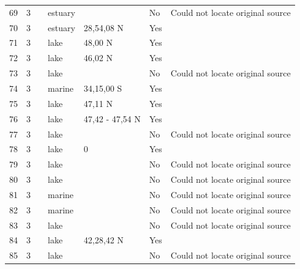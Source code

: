 \documentclass[12pt]{article}
\begin{document}
\begin{landscape}
\begin{table}[h!]
{\begin{tabular}{p{2.8cm}p{1.3cm}p{3cm}p{2.2cm}p{2.5cm}lp{8.2cm}}
        69    & 3 & \cite{Cohen1990}  & estuary &       & No    & Could not locate original source \\
        70    & 3 & \cite{Kemp1977}    & estuary & 28,54,08 N & Yes   &       \\
        71    & 3 & \cite{Sorokin1972}  & lake & 48,00 N & Yes   &       \\
        72    & 3 & \cite{Baril1983}  & lake & 46,02 N & Yes   &       \\
        73    & 3 & \cite{Schiemer1979}  & lake &       & No    & Could not locate original source \\
        74    & 3 & \cite{Brown1964} & marine & 34,15,00 S & Yes   &       \\
        75    & 3 & \cite{Pechlaner1972}  & lake & 47,11 N & Yes   &       \\
        76    & 3 & \cite{Schiemer1979}  & lake & 47,42 - 47,54 N & Yes   &       \\
        77    & 3 & \cite{Cohen1990}  & lake &       & No    & Could not locate original source \\
        78    & 3 & \cite{Burgis1972}  & lake & 0     & Yes   &       \\
        79    & 3 & \cite{Sarvala1974}  & lake &       & No    & Could not locate original source \\
        80    & 3 & \cite{Sarvala1974}  & lake &       & No    & Could not locate original source \\
        81    & 3 & \cite{Hatanaka1977}  & marine &       & No    & Could not locate original source \\
        82    & 3 & \cite{Cohen1990} & marine &       & No    & Could not locate original source \\
        83    & 3 & \cite{Cohen1990}  & lake &       & No    & Could not locate original source \\
        84    & 3 & \cite{Wilbur1972}    & lake & 42,28,42 N & Yes   &       \\
        85    & 3 & \cite{Mizuno1982}  & lake &       & No    & Could not locate original source \\
        \hline
      \end{tabular}}%
      \end{table}

        \newpage


\end{landscape}
\end{document}

